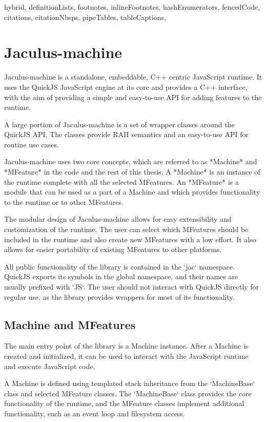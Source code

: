 \begin{markdown*}{%
  hybrid,
  definitionLists,
  footnotes,
  inlineFootnotes,
  hashEnumerators,
  fencedCode,
  citations,
  citationNbsps,
  pipeTables,
  tableCaptions,
}

\chapter{Jaculus-machine} \label{chap:machine}

Jaculus-machine is a standalone, embeddable, C++ centric JavaScript runtime. It uses the QuickJS JavaScript engine at its core and provides a C++ interface, with the aim of providing a simple and easy-to-use API for adding features to the runtime.

A large portion of Jaculus-machine is a set of wrapper classes around the QuickJS API. The classes provide RAII semantics and an easy-to-use API for routine use cases.

Jaculus-machine uses two core concepts, which are referred to as *Machine* and *MFeature* in the code and the rest of this thesis. A *Machine* is an instance of the runtime complete with all the selected MFeatures. An *MFeature* is a module that can be used as a part of a Machine and which provides functionality to the runtime or to other MFeatures.

The modular design of Jaculus-machine allows for easy extensibility and customization of the runtime. The user can select which MFeatures should be included in the runtime and also create new MFeatures with a low effort. It also allows for easier portability of existing MFeatures to other platforms.

All public functionality of the library is contained in the `jac` namespace. QuickJS exports its symbols in the global namespace, and their names are usually prefixed with `JS`. The user should not interact with QuickJS directly for regular use, as the library provides wrappers for most of its functionality.

\section{Machine and MFeatures}

The main entry point of the library is a Machine instance. After a Machine is created and initialized, it can be used to interact with the JavaScript runtime and execute JavaScript code.

A Machine is defined using templated stack inheritance from the `MachineBase` class and selected MFeature classes. The `MachineBase` class provides the core functionality of the runtime, and the MFeature classes implement additional functionality, such as an event loop and filesystem access.


\end{markdown*}
